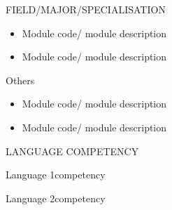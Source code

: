 \documentclass[11pt]{article}
\begin{document}
\begin{body3}
{FIELD/MAJOR/SPECIALISATION}

\noindent \begin{minipage}{16cm}
\begin{itemize}[leftmargin=*]
	\item Module code/ module description
	\item Module code/ module description
\end{itemize}
\end{minipage}
\end{body3}

\begin{body3}
{Others}

\noindent \begin{minipage}{16cm}
\begin{itemize}[leftmargin=*]
	\item Module code/ module description
	\item Module code/ module description
\end{itemize}
\end{minipage}
\end{body3}



\begin{SectionHeaders}{LANGUAGE COMPETENCY}
\end{SectionHeaders}


\begin{body4}
{Language 1}{competency}
\end{body4}

\begin{body4}
{Language 2}{competency}
\end{body4}
\end{document}
